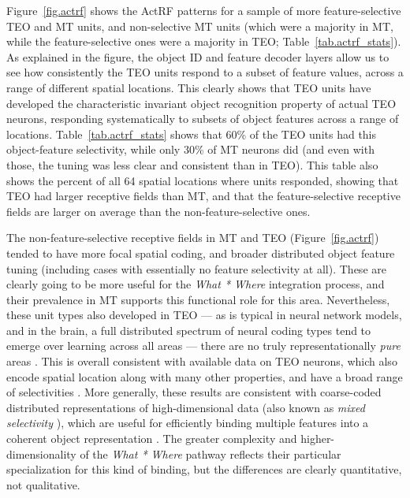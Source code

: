 \documentclass[11pt,twoside]{article}
\newif\myifpdf
\begin{document}

Figure~\ref{fig.actrf} shows the ActRF patterns for a sample of more feature-selective TEO and MT units, and non-selective MT units (which were a majority in MT, while the feature-selective ones were a majority in TEO; Table~\ref{tab.actrf_stats}).  As explained in the figure, the object ID and feature decoder layers allow us to see how consistently the TEO units respond to a subset of feature values, across a range of different spatial locations.  This clearly shows that TEO units have developed the characteristic invariant object recognition property of actual TEO neurons, responding systematically to subsets of object features across a range of locations.  Table~\ref{tab.actrf_stats} shows that 60\% of the TEO units had this object-feature selectivity, while only 30\% of MT neurons did (and even with those, the tuning was less clear and consistent than in TEO).  This table also shows the percent of all 64 spatial locations where units responded, showing that TEO had larger receptive fields than MT, and that the feature-selective receptive fields are larger on average than the non-feature-selective ones.

The non-feature-selective receptive fields in MT and TEO (Figure~\ref{fig.actrf}) tended to have more focal spatial coding, and broader distributed object feature tuning (including cases with essentially no feature selectivity at all).  These are clearly going to be more useful for the {\em What * Where} integration process, and their prevalence in MT supports this functional role for this area.  Nevertheless, these unit types also developed in TEO --- as is typical in neural network models, and in the brain, a full distributed spectrum of neural coding types tend to emerge over learning across all areas --- there are no truly representationally {\em pure} areas \cite{BehrmannPlaut13}.  This is overall consistent with available data on TEO neurons, which also encode spatial location along with many other properties, and have a broad range of selectivities \cite[e.g.,]{HongYaminsMajajEtAl16,MajajHongSolomonEtAl15,ZoccolanKouhPoggioEtAl07,Tanaka96,LogothetisSheinberg96}.  More generally, these results are consistent with coarse-coded distributed representations of high-dimensional data (also known as {\em mixed selectivity} ), which are useful for efficiently binding multiple features into a coherent object representation \cite{HintonMcClellandRumelhart86,OReillyBusby02,OReillyBusbySoto03,CerOReilly06}.  The greater complexity and higher-dimensionality of the {\em What * Where} pathway reflects their particular specialization for this kind of binding, but the differences are clearly quantitative, not qualitative.
\end{document}
